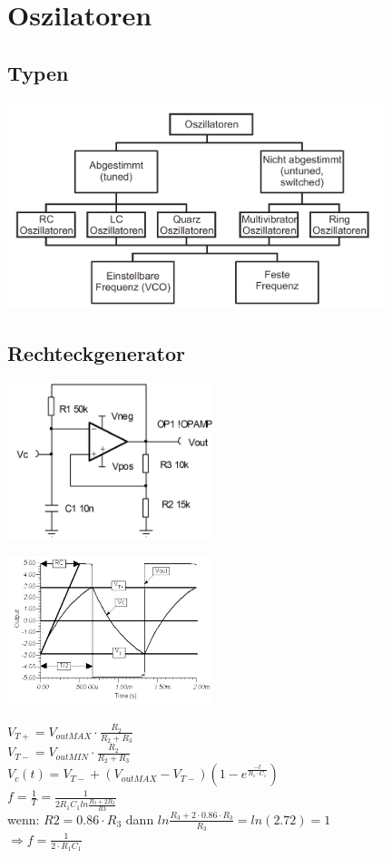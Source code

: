 \section{Oszilatoren}
\subsection{Typen}
	\begin{center}
		\includegraphics[width=11cm]{images/osziTypen.png}
	\end{center}
\subsection{Rechteckgenerator}
	\begin{multicols}{3}
		\includegraphics[width=6cm]{images/osziRechteck.png}
		\columnbreak
		
		\includegraphics[width=6cm]{images/osziRechteckSignal.png}
		\columnbreak
		
		$V_{T+}=V_{outMAX}\cdot\frac{R_2}{R_2+R_3}$\\
		$V_{T-}=V_{outMIN}\cdot\frac{R_2}{R_2+R_3}$\\
		$V_c(t)=V_{T-}+\left(V_{outMAX}-V_{T-}\right)\left(1-e^{\frac{-t}{R_1\cdot
		C_1}}\right)$\\
		$f=\frac{1}{T}=\frac{1}{2R_1C_1 ln \frac{R_3+2R_2}{R3}}$\\
		wenn: $R2 = 0.86 \cdot R_3$ dann $ln\frac{R_3 +2 \cdot 0.86 \cdot R_3}{R_3}=ln
		\left( 2.72 \right) = 1$\\
		$\Longrightarrow f=\frac{1}{2\cdot R_1C_1}$
	\end{multicols}

